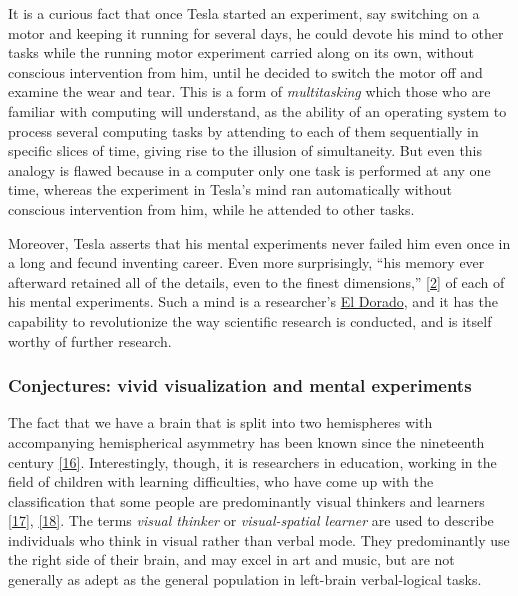 \documentclass[
  12pt,
  british,
  a4paper,
  rgb,
  dvipsnames,
  svgnames,
  hyphens]{article}
\begin{document}
It is a curious fact that once Tesla started an experiment, say
switching on a motor and keeping it running for several days, he could
devote his mind to other tasks while the running motor experiment
carried along on its own, without conscious intervention from him, until
he decided to switch the motor off and examine the wear and tear. This
is a form of \emph{multitasking} which those who are familiar with
computing will understand, as the ability of an operating system to
process several computing tasks by attending to each of them
sequentially in specific slices of time, giving rise to the illusion of
simultaneity. But even this analogy is flawed because in a computer only
one task is performed at any one time, whereas the experiment in Tesla's
mind ran automatically without conscious intervention from him, while he
attended to other tasks.

Moreover, Tesla asserts that his mental experiments never failed him
even once in a long and fecund inventing career. Even more surprisingly,
``his memory ever afterward retained all of the details, even to the
finest dimensions,'' \protect\hyperlink{ref-oneill80}{{[}2{]}} of each
of his mental experiments. Such a mind is a researcher's
\href{https://www.thefreedictionary.com/El+dorado}{El Dorado}, and it
has the capability to revolutionize the way scientific research is
conducted, and is itself worthy of further research.

\hypertarget{conjectures-vivid-visualization-and-mental-experiments}{%
\subsubsection{Conjectures: vivid visualization and mental
experiments}\label{conjectures-vivid-visualization-and-mental-experiments}}

The fact that we have a brain that is split into two hemispheres with
accompanying hemispherical asymmetry has been known since the nineteenth
century \protect\hyperlink{ref-springer89}{{[}16{]}}. Interestingly,
though, it is researchers in education, working in the field of children
with learning difficulties, who have come up with the classification
that some people are predominantly visual thinkers and learners
\protect\hyperlink{ref-silver02}{{[}17{]}},
\protect\hyperlink{ref-west91}{{[}18{]}}. The terms \emph{visual
thinker} or \emph{visual-spatial learner} are used to describe
individuals who think in visual rather than verbal mode. They
predominantly use the right side of their brain, and may excel in art
and music, but are not generally as adept as the general population in
left-brain verbal-logical tasks.
\end{document}
